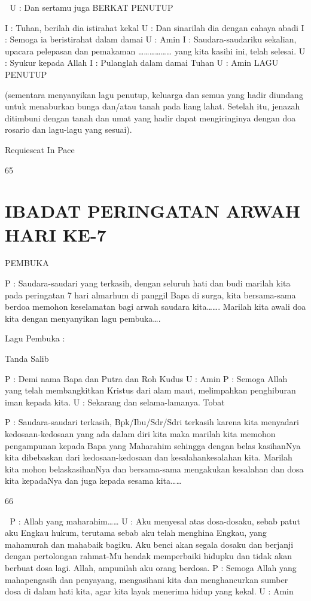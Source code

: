 \documentclass[10pt,a5paper,fancyhdr]{memoir}
\begin{document}

U : Dan sertamu juga 
BERKAT PENUTUP 

I : Tuhan, berilah dia istirahat kekal 
U : Dan sinarilah dia dengan cahaya abadi 
I : Semoga ia beristirahat dalam damai 
U : Amin 
I : Saudara-saudariku sekalian, upacara pelepasan dan pemakaman 
……………… yang kita kasihi ini, telah selesai. 
U : Syukur kepada Allah 
I : Pulanglah dalam damai Tuhan 
U : Amin 
LAGU PENUTUP 

(sementara menyanyikan lagu penutup, keluarga dan semua yang 
hadir diundang untuk menaburkan bunga dan/atau tanah pada liang 
lahat. Setelah itu, jenazah ditimbuni dengan tanah dan umat yang 
hadir dapat mengiringinya dengan doa rosario dan lagu-lagu yang 
sesuai). 

Requiescat In Pace 

65 



\chapter{IBADAT PERINGATAN ARWAH HARI KE-7} 

PEMBUKA 

P 
: Saudara-saudari yang terkasih, dengan seluruh hati dan 
budi marilah kita pada peringatan 7 hari almarhum di 
panggil Bapa di surga, kita bersama-sama berdoa memohon 
keselamatan bagi arwah saudara kita……. 
Marilah kita awali doa kita dengan menyanyikan lagu 
pembuka…. 

Lagu Pembuka : 

Tanda Salib 

P 
: Demi nama Bapa dan Putra dan Roh Kudus 
U 
: Amin 
P 
: Semoga Allah yang telah membangkitkan Kristus dari 
alam maut, melimpahkan penghiburan iman kepada kita. 
U 
: Sekarang dan selama-lamanya. 
Tobat 

P 
: Saudara-saudari terkasih, 
Bpk/Ibu/Sdr/Sdri terkasih karena kita menyadari 
kedosaan-kedosaan yang ada dalam diri kita maka 
marilah kita memohon pengampunan kepada Bapa yang 
Maharahim sehingga dengan belas kasihanNya kita 
dibebaskan dari kedosaan-kedosaan dan kesalahankesalahan 
kita. Marilah kita mohon belaskasihanNya dan 
bersama-sama mengakukan kesalahan dan dosa kita 
kepadaNya dan juga kepada sesama kita…… 

66 



P 
: Allah yang maharahim…… 
U 
: Aku menyesal atas dosa-dosaku, sebab patut aku Engkau 
hukum, terutama sebab aku telah menghina Engkau, yang 
mahamurah dan mahabaik bagiku. Aku benci akan segala 
dosaku dan berjanji dengan pertolongan rahmat-Mu 
hendak memperbaiki hidupku dan tidak akan berbuat dosa 
lagi. Allah, ampunilah aku orang berdosa. 
P : Semoga Allah yang mahapengasih dan penyayang, 
mengasihani kita dan menghancurkan sumber dosa di dalam 
hati kita, agar kita layak menerima hidup yang kekal. 
U : Amin 
\end{document}

